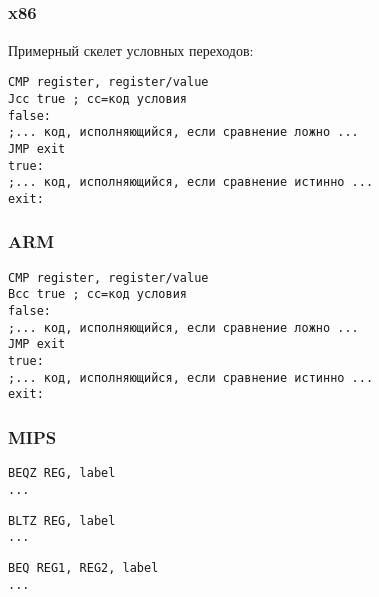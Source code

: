 \label{sec:Jcc}






\subsection{\Conclusion{}}

\subsubsection{x86}

Примерный скелет условных переходов:

\begin{lstlisting}[caption=x86,style=customasmx86]
CMP register, register/value
Jcc true ; cc=код условия
false:
;... код, исполняющийся, если сравнение ложно ...
JMP exit 
true:
;... код, исполняющийся, если сравнение истинно ...
exit:
\end{lstlisting}

\subsubsection{ARM}

\begin{lstlisting}[caption=ARM,style=customasmARM]
CMP register, register/value
Bcc true ; cc=код условия
false:
;... код, исполняющийся, если сравнение ложно ...
JMP exit 
true:
;... код, исполняющийся, если сравнение истинно ...
exit:
\end{lstlisting}

\subsubsection{MIPS}

\begin{lstlisting}[caption=Проверка на ноль,style=customasmMIPS]
BEQZ REG, label
...
\end{lstlisting}

\begin{lstlisting}[caption=Меньше ли нуля? (используя псевдоинструкцию),style=customasmMIPS]
BLTZ REG, label
...
\end{lstlisting}

\begin{lstlisting}[caption=Проверка на равенство,style=customasmMIPS]
BEQ REG1, REG2, label
...
\end{lstlisting}

